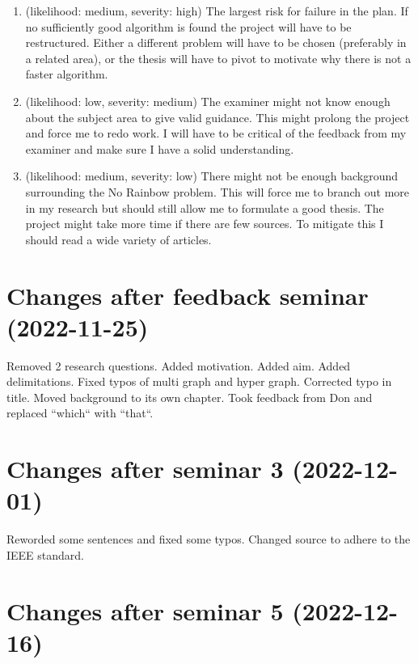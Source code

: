 \documentclass[msc,lith,english]{liuthesis}
\begin{document}
\begin{enumerate}
  \item (likelihood: medium, severity: high)
    The largest risk for failure in the plan. If no sufficiently good algorithm
    is found the project will have to be restructured. Either a different problem
    will have to be chosen (preferably in a related area), or the thesis will have
    to pivot to motivate why there is not a faster algorithm.

  \item (likelihood: low, severity: medium)
    The examiner might not know enough about the subject area to give valid
    guidance. This might prolong the project and force me to redo work. I will
    have to be critical of the feedback from my examiner and make sure I have a
    solid understanding.

  \item (likelihood: medium, severity: low)
    There might not be enough background surrounding the No Rainbow problem.
    This will force me to branch out more in my research but should still allow
    me to formulate a good thesis. The project might take more time if there
    are few sources. To mitigate this I should read a wide variety of articles.
\end{enumerate}

\printbibliography

\appendix
\chapter{Changes after feedback seminar (2022-11-25)}
Removed 2 research questions. Added motivation. Added aim. Added delimitations. Fixed typos of multi graph and hyper graph. Corrected typo in title. Moved background to its own chapter. Took feedback from Don and replaced ``which`` with ``that``.

\chapter{Changes after seminar 3 (2022-12-01)}
Reworded some sentences and fixed some typos. Changed source to adhere to the IEEE standard.

\chapter{Changes after seminar 5 (2022-12-16)}
\end{document}
